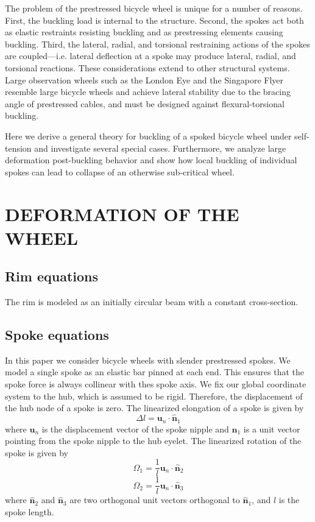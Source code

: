 \documentclass{bmd2016p}
\begin{document}
The problem of the prestressed bicycle wheel is unique for a number of reasons. First, the buckling load is internal to the structure. Second, the spokes act both as elastic restraints resisting buckling and as prestressing elements causing buckling. Third, the lateral, radial, and torsional restraining actions of the spokes are coupled---i.e. lateral deflection at a spoke may produce lateral, radial, and torsional reactions. These considerations extend to other structural systems. Large observation wheels such as the London Eye\cite{Mann2001a} and the Singapore Flyer\cite{Allsop2009a} resemble large bicycle wheels and achieve lateral stability due to the bracing angle of prestressed cables, and must be designed against flexural-torsional buckling.

Here we derive a general theory for buckling of a spoked bicycle wheel under self-tension and investigate several special cases. Furthermore, we analyze large deformation post-buckling behavior and show how local buckling of individual spokes can lead to collapse of an otherwise sub-critical wheel.

\section{DEFORMATION OF THE WHEEL}
\subsection{Rim equations}

The rim is modeled as an initially circular beam with a constant cross-section.

\subsection{Spoke equations}

In this paper we consider bicycle wheels with slender prestressed spokes. We model a single spoke as an elastic bar pinned at each end. This ensures that the spoke force is always collinear with thes spoke axis. We fix our global coordinate system to the hub, which is assumed to be rigid. Therefore, the displacement of the hub node of a spoke is zero. The linearized elongation of a spoke is given by
\begin{equation}\label{eq:selong}
\Delta l = \bm{u}_n\cdot \hat{\bm{n}}_1
\end{equation}
where $\bm{u}_n$ is the displacement vector of the spoke nipple and $\hat{\bm{n}}_1$ is a unit vector pointing from the spoke nipple to the hub eyelet. The linearized rotation of the spoke is given by
\begin{equation}\label{eq:srot1}
\Omega_1 = \frac{1}{l} \bm{u}_n\cdot \hat{\bm{n}}_2
\end{equation}
\begin{equation}\label{eq:srot2}
\Omega_2 = \frac{1}{l} \bm{u}_n\cdot \hat{\bm{n}}_3
\end{equation}
where $\hat{\bm{n}}_2$ and $\hat{\bm{n}}_3$ are two orthogonal unit vectors orthogonal to $\hat{\bm{n}}_1$, and $l$ is the spoke length.
\end{document}
